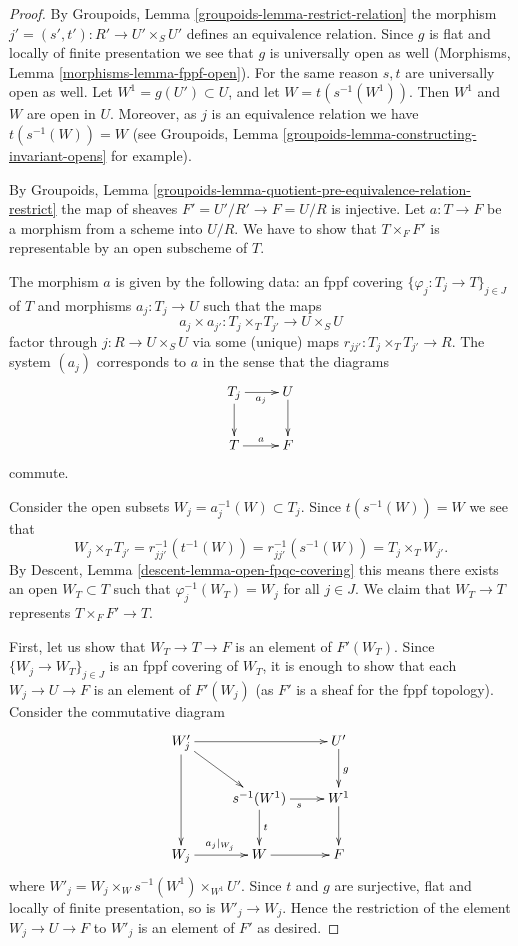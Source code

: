 \documentclass[10pt,a4paper]{amsart}
\theoremstyle{plain}
\theoremstyle{definition}
\theoremstyle{remark}
\numberwithin{equation}{subsection}
\begin{document}
\begin{proof}
By Groupoids, Lemma \ref{groupoids-lemma-restrict-relation}
the morphism $j' = (s', t') : R' \to U' \times_S U'$
defines an equivalence relation. Since $g$ is flat and locally of
finite presentation we see that $g$ is universally open as well
(Morphisms, Lemma \ref{morphisms-lemma-fppf-open}).
For the same reason $s, t$ are universally open as well.
Let $W^1 = g(U') \subset U$, and let $W = t(s^{-1}(W^1))$.
Then $W^1$ and $W$ are open in $U$. Moreover, as $j$ is an
equivalence relation we have $t(s^{-1}(W)) = W$ (see
Groupoids, Lemma \ref{groupoids-lemma-constructing-invariant-opens}
for example).

\medskip\noindent
By
Groupoids,
Lemma \ref{groupoids-lemma-quotient-pre-equivalence-relation-restrict}
the map of sheaves $F' = U'/R' \to F = U/R$ is injective.
Let $a : T \to F$ be a morphism from a scheme into $U/R$.
We have to show that $T \times_F F'$ is representable
by an open subscheme of $T$.

\medskip\noindent
The morphism $a$ is given by the following data:
an fppf covering $\{\varphi_j : T_j \to T\}_{j \in J}$ of $T$ and
morphisms $a_j : T_j \to U$ such that the maps
$$
a_j \times a_{j'} :
T_j \times_T T_{j'}
\longrightarrow
U \times_S U
$$
factor through $j : R \to U \times_S U$ via some (unique) maps
$r_{jj'} : T_j \times_T T_{j'} \to R$. The system
$(a_j)$ corresponds to $a$ in the sense that the diagrams
$$
\xymatrix{
T_j \ar[r]_{a_j} \ar[d] & U \ar[d] \\
T \ar[r]^a & F
}
$$
commute.

\medskip\noindent
Consider the open subsets $W_j = a_j^{-1}(W) \subset T_j$.
Since $t(s^{-1}(W)) = W$ we see that
$$
W_j \times_T T_{j'} =
r_{jj'}^{-1}(t^{-1}(W)) = r_{jj'}^{-1}(s^{-1}(W)) =
T_j \times_T W_{j'}.
$$
By
Descent, Lemma \ref{descent-lemma-open-fpqc-covering}
this means there exists an open
$W_T \subset T$ such that $\varphi_j^{-1}(W_T) = W_j$ for all $j \in J$.
We claim that $W_T \to T$ represents $T \times_F F' \to T$.

\medskip\noindent
First, let us show that $W_T \to T \to F$ is an element of
$F'(W_T)$. Since $\{W_j \to W_T\}_{j \in J}$ is an
fppf covering of $W_T$, it is enough to show that
each $W_j \to U \to F$ is an element of $F'(W_j)$ (as $F'$ is a sheaf
for the fppf topology). Consider the commutative diagram
$$
\xymatrix{
W'_j \ar[rr] \ar[dd] \ar[rd] & & U' \ar[d]^g \\
& s^{-1}(W^1) \ar[r]_s \ar[d]^t & W^1 \ar[d] \\
W_j \ar[r]^{a_j|_{W_j}} & W \ar[r] & F
}
$$
where $W'_j = W_j \times_W s^{-1}(W^1) \times_{W^1} U'$.
Since $t$ and $g$ are surjective, flat and locally of finite
presentation, so is $W'_j \to W_j$. Hence the restriction of
the element $W_j \to U \to F$ to $W'_j$ is an element of $F'$
as desired.


\end{proof}
\end{document}
